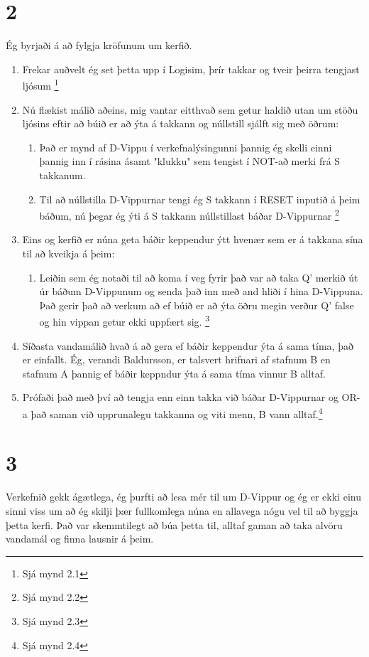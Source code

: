 \documentclass{article}
\begin{document}
\section*{2}
Ég byrjaði á að fylgja kröfunum um kerfið.
\begin{enumerate}
    \item Frekar auðvelt ég set þetta upp í Logisim, þrír takkar og tveir þeirra tengjast ljósum \footnote{Sjá mynd 2.1}
    \item Nú flækist málið aðeins, mig vantar eitthvað sem getur haldið utan um stöðu ljósins eftir að búið er að ýta á takkann og núllstill sjálft sig með öðrum: 
    \begin{enumerate}
        \item Það er mynd af D-Vippu í verkefnalýsingunni þannig ég skelli einni þannig inn í rásina ásamt "klukku" sem tengist í NOT-að merki frá S takkanum.
        \item Til að núllstilla D-Vippurnar tengi ég S takkann í RESET inputið á þeim báðum, nú þegar ég ýti á S takkann núllstillast báðar D-Vippurnar \footnote{Sjá mynd 2.2}
    \end{enumerate} 
    \item Eins og kerfið er núna geta báðir keppendur ýtt hvenær sem er á takkana sína til að kveikja á þeim:
    \begin{enumerate}
        \item Leiðin sem ég notaði til að koma í veg fyrir það var að taka Q' merkið út úr báðum D-Vippunum og senda það inn með and hliði í hina D-Vippuna. 
        Það gerir það að verkum að ef búið er að ýta öðru megin verður Q' false og hin vippan getur ekki uppfært sig. \footnote{Sjá mynd 2.3}
    \end{enumerate}
    \item Síðasta vandamálið hvað á að gera ef báðir keppendur ýta á sama tíma, það er einfallt. Ég, verandi Baldursson, er talsvert hrifnari af stafnum B en stafnum A þannig ef báðir keppndur ýta á sama tíma vinnur B alltaf.
    \item Prófaði það með því að tengja enn einn takka við báðar D-Vippurnar og OR-a það saman við upprunalegu takkanna og viti menn, B vann alltaf.\footnote{Sjá mynd 2.4}
\end{enumerate}

\section{3}
Verkefnið gekk ágætlega, ég þurfti að lesa mér til um D-Vippur og ég er ekki einu sinni viss um að ég skilji þær fullkomlega núna en allavega nógu vel til að byggja þetta kerfi.
Það var skemmtilegt að búa þetta til, alltaf gaman að taka alvöru vandamál og finna lausnir á þeim.
\end{document}
